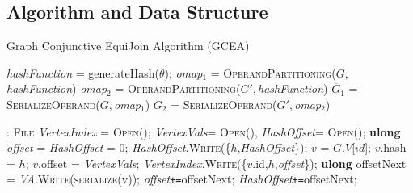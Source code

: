 \subsection{Algorithm and Data Structure}
\label{sec:algo}
\begin{algorithm}[!b]
	\caption{Graph Conjunctive EquiJoin Algorithm (GCEA)}\label{alg:cogrouped}
	{
		\begin{minipage}{\linewidth}
			\begin{algorithmic}[1]
				\State \textit{hashFunction} = generateHash($\theta$);
				\State \textit{omap}$_1$ = \textsc{OperandPartitioning}($G,$\textit{hashFunction})
				\State \textit{omap}$_2$ = \textsc{OperandPartitioning}($G',$\textit{hashFunction})
				\State $\overline{G}_1$ = \textsc{SerializeOperand}($G,$\textit{omap}$_1$)
				\State  $\overline{G}_2$ = \textsc{SerializeOperand}($G',$\textit{omap}$_2$)

				\EndProcedure

				\State



				:
				\State \textsc{File} \textit{VertexIndex} = \textsc{Open()};
				\State \textit{VertexVals}= \textsc{Open()}, \textit{HashOffset}= \textsc{Open()};
				\State \textbf{ulong} \textit{offset} = \textit{HashOffset} = 0;
				 
				\State \textit{HashOffset}.\textsc{Write}(\{$h$,\textit{HashOffset}\});
				\State $v$ = $G$.$V$[$id$];
				\State $v$.hash = $h$; $v$.offset = \textit{VertexVals};
				\State \textit{VertexIndex}.\textsc{Write}(\{$v$.id,\;$h$,\;\textit{offset}\});
				\State \textbf{ulong} offsetNext = \textit{VA}.\textsc{Write}(\textsc{serialize}(v));
				\State \textit{offset}\texttt{+=}offsetNext; \textit{HashOffset}\texttt{+=}offsetNext;
				\EndFor
				\EndFor
				\EndProcedure


				\State



\end{algorithmic}
\end{minipage}}
\end{algorithm}
